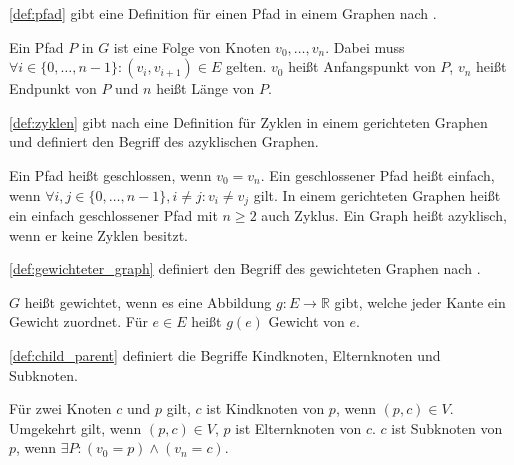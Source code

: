 \autoref{def:pfad} gibt eine Definition für einen Pfad in einem Graphen nach
\autocite[Vgl.][S.221f]{AlgorithmenUndDatenstrukturen}.
\begin{definition}
    Ein Pfad $P$ in $G$  ist eine Folge von Knoten $v_0, \dots ,v_n$. Dabei
    muss $\forall i \in \{0, \dots, n-1 \} : (v_i,v_{i+1}) \in E$ gelten. $v_0$
    heißt Anfangspunkt von $P$, $v_n$ heißt Endpunkt von $P$ und $n$ heißt
    Länge von $P$.
    \label{def:pfad}
\end{definition}

\autoref{def:zyklen} gibt nach
\autocite[Vgl.][S.222]{AlgorithmenUndDatenstrukturen} eine Definition für
Zyklen in einem gerichteten Graphen und definiert den Begriff des azyklischen
Graphen.
\begin{definition}
    Ein Pfad heißt geschlossen, wenn $v_0 = v_n$. Ein
    geschlossener Pfad heißt einfach, wenn $\forall i,j \in \{0,\dots,n-1\}, i
    \ne j:v_i \ne v_j$ gilt. In einem gerichteten Graphen heißt ein einfach
    geschlossener Pfad mit $n\geq 2$ auch Zyklus. Ein Graph heißt azyklisch,
    wenn er keine Zyklen besitzt.
    \label{def:zyklen}
\end{definition}

\autoref{def:gewichteter_graph} definiert den Begriff des gewichteten Graphen
nach \autocite[Vgl.][S.253]{AlgorithmenUndDatenstrukturen}.
\begin{definition}
    $G$ heißt gewichtet, wenn es eine Abbildung $g:E\rightarrow \mathbb{R}$
    gibt, welche jeder Kante ein Gewicht zuordnet. Für $e\in E$ heißt $g(e)$
    Gewicht von $e$.
    \label{def:gewichteter_graph}
\end{definition}

\autoref{def:child_parent} definiert die Begriffe Kindknoten, Elternknoten und
Subknoten.
\begin{definition}
    Für zwei Knoten $c$ und $p$ gilt, $c$ ist Kindknoten von $p$, wenn $(p,c)\in V$.
    Umgekehrt gilt, wenn $(p,c)\in V$, $p$ ist Elternknoten von $c$.
    $c$ ist Subknoten von $p$, wenn $\exists P: (v_0=p) \land (v_n=c)$.
    \label{def:child_parent}
\end{definition}

